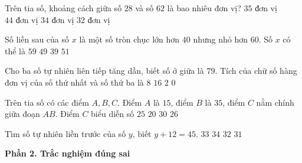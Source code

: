 \begin{ex} %
Trên tia số, khoảng cách giữa số $28$ và số $62$ là bao nhiêu đơn vị?
\choice
{$35\text{ đơn vị}$}
{$44\text{ đơn vị}$}
{\True $34\text{ đơn vị}$}
{$32\text{ đơn vị}$}
\end{ex}

\begin{ex} %
Số liền sau của số $x$ là một số tròn chục lớn hơn $40$ nhưng nhỏ hơn $60$. Số $x$ có thể là
\choice
{$59$}
{\True $49$}
{$39$}
{$51$}
\end{ex}

\begin{ex} %
Cho ba số tự nhiên liên tiếp tăng dần, biết số ở giữa là $79$. Tích của chữ số hàng đơn vị của số thứ nhất và số thứ ba là
\choice
{$8$}
{$16$}
{$2$}
{\True $0$}
\end{ex}

\begin{ex} %
Trên tia số có các điểm $A, B, C$. Điểm $A$ là $15$, điểm $B$ là $35$, điểm $C$ nằm chính giữa đoạn $AB$. Điểm $C$ biểu diễn số
\choice
{\True $25$}
{$20$}
{$30$}
{$26$}
\end{ex}

\begin{ex} %
Tìm số tự nhiên liền trước của số $y$, biết $y + 12 = 45$.
\choice
{$33$}
{$34$}
{\True $32$}
{$31$}
\end{ex}

\textbf{Phần 2. Trắc nghiệm đúng sai}

